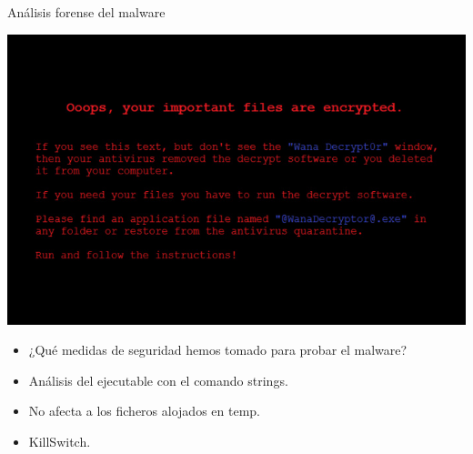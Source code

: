 \documentclass[10pt]{beamer}
\begin{document}
\begin{frame}{Análisis forense del malware}
	\pause
	\begin{center}
		\includegraphics[scale=0.3]{./Imagenes/wannacry-3.jpg}
	\end{center}
	\pause
	\begin{itemize}
		\item ¿Qué medidas de seguridad hemos tomado para probar el malware?
		\pause
		\item Análisis del ejecutable con el comando strings.
		\pause
		\item No afecta a los ficheros alojados en temp.
		\pause
		\item KillSwitch.
	\end{itemize}
\end{frame}
\end{document}
